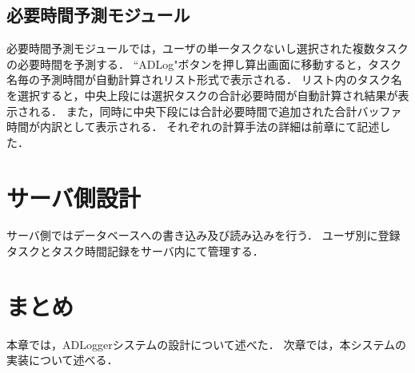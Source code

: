 \subsection{必要時間予測モジュール}
必要時間予測モジュールでは，ユーザの単一タスクないし選択された複数タスクの必要時間を予測する．
``ADLog"ボタンを押し算出画面に移動すると，タスク名毎の予測時間が自動計算されリスト形式で表示される．
リスト内のタスク名を選択すると，中央上段には選択タスクの合計必要時間が自動計算され結果が表示される．
また，同時に中央下段には合計必要時間で追加された合計バッファ時間が内訳として表示される．
それぞれの計算手法の詳細は前章にて記述した．


\section{サーバ側設計}
サーバ側ではデータベースへの書き込み及び読み込みを行う．
ユーザ別に登録タスクとタスク時間記録をサーバ内にて管理する．

\section{まとめ}
本章では，ADLoggerシステムの設計について述べた．
次章では，本システムの実装について述べる．